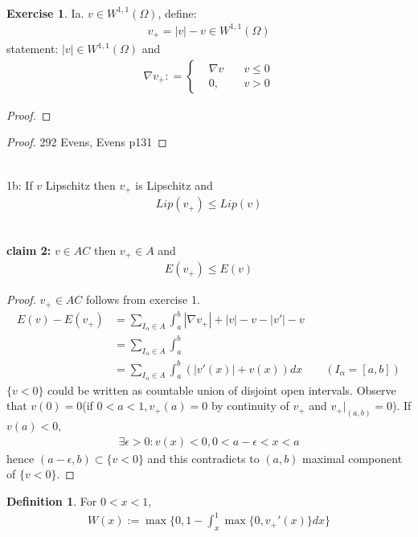 \documentclass[a4paper,12pt,oneside,fleqn]{book}
\theoremstyle{definition}
\newtheorem{definition}{Definition}[section]
\newtheorem{exercise}{Exercise}[chapter]
\theoremstyle{remark}
\begin{document}
\quad\\
\begin{exercise}
Ia.  $v \in W^{1, 1}(\Omega)$, define:
\begin{align*}
	v_+ = |v| - v \in W^{1, 1}(\Omega)
\end{align*}
 statement: $|v|\in W^{1, 1}(\Omega)$ and
 \begin{align*}
	\nabla v_+: = \left\{
	\begin{aligned}
		& \nabla v \quad &v \le  0\\
		& 0, &v > 0
	\end{aligned}
	\right.
\end{align*}
\begin{proof}
\end{proof}
\end{exercise}



\begin{proof}
	292 Evens, Evens p131
\end{proof}
\quad\\
1b: If $v$ Lipschitz then $v_+$ is Lipschitz and 
\begin{align*}
	Lip(v_+) \le Lip(v)
\end{align*}


\quad\\
\textbf{claim 2:}
$v \in AC$ then $v_+ \in A$ and 
\begin{align*}
	E(v_+ ) \le E(v)
\end{align*}
\begin{proof}
	$v_+ \in AC$ follows from exercise 1.
	\begin{align*}
		E(v) - E(v_+) &= \sum_{I_\alpha \in A} \int_a^b |\nabla v_+| + |v| - v - |v'| - v   \\
		&= \sum_{I_\alpha \in A} \int_a^b \\
		&= \sum_{I_\alpha \in A} \int_a^b (|v'(x)| + v(x))dx \qquad (I_\alpha = [a, b])
	\end{align*}
	$\{v < 0\}$ could be written as countable union of disjoint open intervals. Observe that $v(0) = 0$(if $0 < a < 1, v_+(a) = 0$ by continuity of $v_+$ and $v_+ |_{(a, b)} = 0$). If $v(a) < 0$, 
	\begin{align*}
		\exists \epsilon > 0: v(x) < 0, 0< a - \epsilon < x < a
	\end{align*}
	hence $(a - \epsilon, b) \subset \{v < 0\}$ and this contradicts to $(a, b)$ maximal component of $\{ v < 0\}$. 
\end{proof}

\begin{definition}
For $0 < x < 1$, 
\begin{align*}
	W(x) :=  \max\bigg\{ 0, 1 - \int_x^1 \max\{0, v_+'(x)\}dx \bigg\}
\end{align*}
\end{definition}
\end{document}
